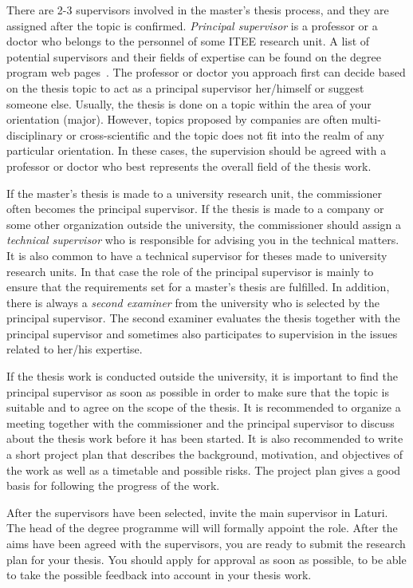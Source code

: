 There are 2-3 supervisors involved in the master’s thesis process, and they are assigned after the topic is confirmed. \textit{Principal supervisor} is a professor or a doctor who belongs to the personnel of some ITEE research unit. A list of potential supervisors and their fields of expertise can be found on the degree program web pages~\cite{mscstudies}. The professor or doctor you approach first can decide based on the thesis topic to act as a principal supervisor her/himself or suggest someone else.  Usually, the thesis is done on a topic within the area of your orientation (major).  However, topics proposed by companies are often multi-disciplinary or cross-scientific  and the topic does not fit into the realm of any particular orientation. In these cases, the supervision should be agreed with a professor or doctor who best represents the overall field of the thesis work.

If the master’s thesis is made to a university research unit, the commissioner often becomes the principal supervisor. If the thesis is made to a company or some other organization outside the university, the commissioner should assign a \textit{technical supervisor} who is responsible for advising you in the technical matters. It is also common to have a technical supervisor for theses made to university research units. In that case the role of the principal supervisor is mainly to ensure that the requirements set for a master’s thesis are fulfilled. In addition, there is always a \textit{second examiner} from the university who is selected by the principal supervisor. The second examiner evaluates the thesis together with the principal supervisor and sometimes also participates to supervision in the issues related to her/his expertise.

If the thesis work is conducted outside the university, it is important to find the principal supervisor as soon as possible in order to make sure that the topic is suitable and to agree on the scope of the thesis. It is recommended to organize a meeting together with the commissioner and the principal supervisor to discuss about the thesis work before it has been started. It is also recommended to write a short project plan that describes the background, motivation, and objectives of the work as well as a timetable and possible risks. The project plan gives a good basis for following the progress of the work.

After the supervisors have been selected, invite the main supervisor in Laturi. The head of the degree programme will will formally appoint the role. After the aims have been agreed with the supervisors, you are ready to submit the research plan for your thesis.  You should apply for approval as soon as possible, to be able to take the possible feedback into account in your thesis work. 

